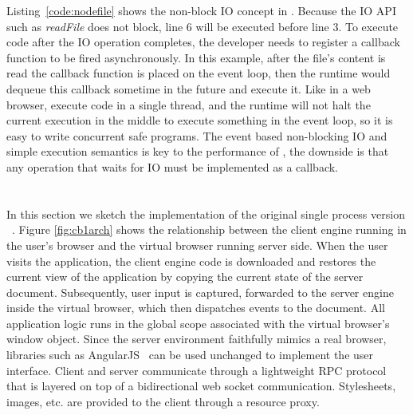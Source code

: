
Listing~\ref{code:nodefile} shows the non-block IO concept in \nodejs.
Because the IO API such as \emph{readFile} does not
block, line 6 will be executed before line 3.
To execute code after the IO operation completes,
the developer needs to register a callback function to be fired asynchronously.
In this example, after the file's content is read the callback function is placed on the
event loop,
then the runtime would dequeue this callback sometime in the future and execute it.
Like in a web browser, \nodejs execute \js code in a single thread,
and the runtime will not halt the current execution in the middle to execute something in
the event loop, so it is easy to write concurrent safe programs.
The event based non-blocking IO and simple execution semantics
is key to the performance of \nodejs,
the downside is that any operation that waits for IO must be implemented as a callback.



\section{\cb}

\architectureoverview{}

In this section we sketch the implementation of
the original single process version \cb{}~\cite{mcdaniel2012cloudbrowser}.
Figure \ref{fig:cb1arch} shows the relationship
between the client engine running in the user's browser and the virtual browser
running server side.  When the user visits the application, the client engine
code is downloaded and restores the current view of the application by
copying the current state of the server document.  Subsequently, user input
is captured, forwarded to the server engine inside the virtual browser,
which then dispatches events to the document.  All application logic runs
in the global scope associated with the virtual browser's window object.
Since the server environment faithfully mimics a real browser, libraries
such as AngularJS~\cite{hevery2009angular} can be used unchanged to implement the user interface.
Client and server communicate through a lightweight RPC protocol that is
layered on top of a bidirectional web socket communication.
Stylesheets, images, etc. are provided to the client through a resource
proxy.

